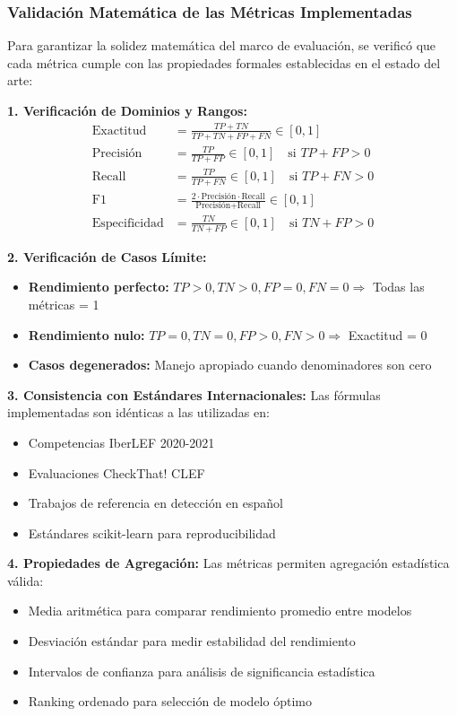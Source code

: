 \subsubsection{Validación Matemática de las Métricas Implementadas}

Para garantizar la solidez matemática del marco de evaluación, se verificó que cada métrica cumple con las propiedades formales establecidas en el estado del arte:

\textbf{1. Verificación de Dominios y Rangos:}
\begin{align}
\text{Exactitud} &= \frac{TP + TN}{TP + TN + FP + FN} \in [0,1] \\
\text{Precisión} &= \frac{TP}{TP + FP} \in [0,1] \quad \text{si } TP + FP > 0 \\
\text{Recall} &= \frac{TP}{TP + FN} \in [0,1] \quad \text{si } TP + FN > 0 \\
\text{F1} &= \frac{2 \cdot \text{Precisión} \cdot \text{Recall}}{\text{Precisión} + \text{Recall}} \in [0,1] \\
\text{Especificidad} &= \frac{TN}{TN + FP} \in [0,1] \quad \text{si } TN + FP > 0
\end{align}

\textbf{2. Verificación de Casos Límite:}
\begin{itemize}
    \item \textbf{Rendimiento perfecto:} $TP > 0, TN > 0, FP = 0, FN = 0 \Rightarrow$ Todas las métricas = 1
    \item \textbf{Rendimiento nulo:} $TP = 0, TN = 0, FP > 0, FN > 0 \Rightarrow$ Exactitud = 0
    \item \textbf{Casos degenerados:} Manejo apropiado cuando denominadores son cero
\end{itemize}

\textbf{3. Consistencia con Estándares Internacionales:}
Las fórmulas implementadas son idénticas a las utilizadas en:
\begin{itemize}
    \item Competencias IberLEF 2020-2021 \cite{aragon2020overview, gomez2021overview}
    \item Evaluaciones CheckThat! CLEF \cite{barron2023clef}
    \item Trabajos de referencia en detección en español \cite{posadas2019detection, blanco2024enhancing}
    \item Estándares scikit-learn para reproducibilidad
\end{itemize}

\textbf{4. Propiedades de Agregación:}
Las métricas permiten agregación estadística válida:
\begin{itemize}
    \item Media aritmética para comparar rendimiento promedio entre modelos
    \item Desviación estándar para medir estabilidad del rendimiento
    \item Intervalos de confianza para análisis de significancia estadística
    \item Ranking ordenado para selección de modelo óptimo
\end{itemize}

